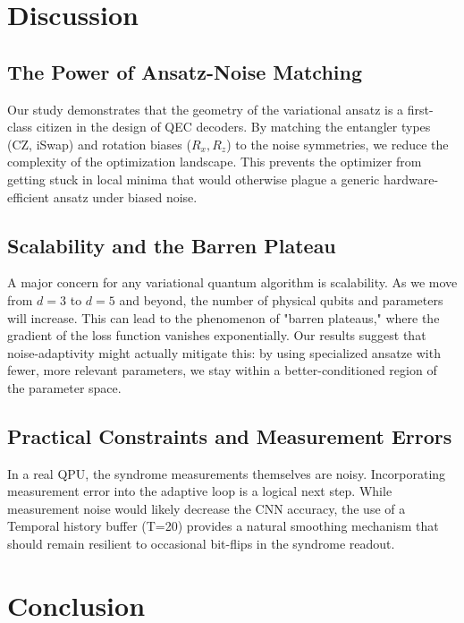 \documentclass[journal,twocolumn]{IEEEtran}
\begin{document}
\section{Discussion}

\subsection{The Power of Ansatz-Noise Matching}

Our study demonstrates that the geometry of the variational ansatz is a first-class citizen in the design of QEC decoders. By matching the entangler types (CZ, iSwap) and rotation biases ($R_x, R_z$) to the noise symmetries, we reduce the complexity of the optimization landscape. This prevents the optimizer from getting stuck in local minima that would otherwise plague a generic hardware-efficient ansatz under biased noise.

\subsection{Scalability and the Barren Plateau}

A major concern for any variational quantum algorithm is scalability. As we move from $d=3$ to $d=5$ and beyond, the number of physical qubits and parameters will increase. This can lead to the phenomenon of "barren plateaus," where the gradient of the loss function vanishes exponentially. Our results suggest that noise-adaptivity might actually mitigate this: by using specialized ansatze with fewer, more relevant parameters, we stay within a better-conditioned region of the parameter space.

\subsection{Practical Constraints and Measurement Errors}

In a real QPU, the syndrome measurements themselves are noisy. Incorporating measurement error into the adaptive loop is a logical next step. While measurement noise would likely decrease the CNN accuracy, the use of a Temporal history buffer (T=20) provides a natural smoothing mechanism that should remain resilient to occasional bit-flips in the syndrome readout.

\section{Conclusion}
\end{document}
